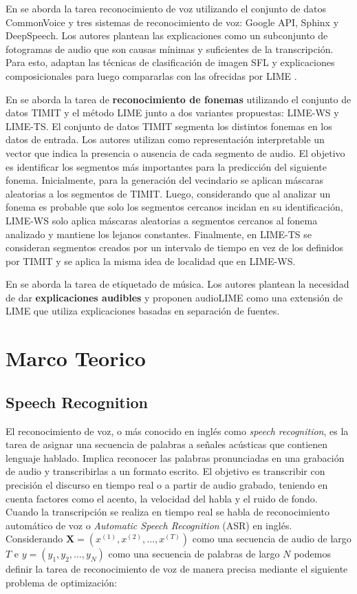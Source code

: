 \documentclass[conference]{IEEEtran}
\begin{document}
En \cite{10094635} se aborda la tarea reconocimiento de voz utilizando el conjunto de datos CommonVoice \cite{commonvoice:2020} y tres sistemas de reconocimiento de voz: Google API, Sphinx y DeepSpeech. Los autores plantean las explicaciones como un subconjunto de fotogramas de audio que son causas mínimas y suficientes de la transcripción. Para esto, adaptan las técnicas de clasificación de imagen SFL \cite{sun2020explaining} y explicaciones composicionales \cite{unknown} para luego compararlas con las ofrecidas por LIME \cite{ribeiro2016why}.

En \cite{wu2023trust} se aborda la tarea de \textbf{reconocimiento de fonemas} utilizando el conjunto de datos TIMIT \cite{timit} y el método LIME junto a dos variantes propuestas: LIME-WS y LIME-TS. El conjunto de datos TIMIT segmenta los distintos fonemas en los datos de entrada. Los autores utilizan como representación interpretable un vector que indica la presencia o ausencia de cada segmento de audio. El objetivo es identificar los segmentos más importantes para la predicción del siguiente fonema. Inicialmente, para la generación del vecindario se aplican máscaras aleatorias a los segmentos de TIMIT. Luego, considerando que al analizar un fonema es probable que solo los segmentos cercanos incidan en su identificación, LIME-WS solo aplica máscaras aleatorias a segmentos cercanos al fonema analizado y mantiene los lejanos constantes. Finalmente, en LIME-TS se consideran segmentos creados por un intervalo de tiempo en vez de los definidos por TIMIT y se aplica la misma idea de localidad que en LIME-WS.

En \cite{DBLP:journals/corr/abs-2008-00582} se aborda la tarea de etiquetado de música. Los autores plantean la necesidad de dar \textbf{explicaciones audibles} y proponen audioLIME como una extensión de LIME que utiliza explicaciones basadas en separación de fuentes.

\section{Marco Teorico} \label{3-Theoretical-Framework}

\subsection{Speech Recognition}
El reconocimiento de voz, o más conocido en inglés como \textit{speech recognition}, es la tarea de asignar una secuencia de palabras a señales acústicas que contienen lenguaje hablado. 
Implica reconocer las palabras pronunciadas en una grabación de audio y transcribirlas a un formato escrito. El objetivo es transcribir con precisión el discurso en tiempo real o a partir de audio grabado, teniendo en cuenta factores como el acento, la velocidad del habla y el ruido de fondo.
Cuando la transcripción se realiza en tiempo real se habla de reconocimiento automático de voz o \textit{Automatic Speech Recognition} (ASR) en inglés. Considerando $\mathbf{X} = (x^{(1)}, x^{(2)} ,\dots, x^{(T)})$ como una secuencia de audio de largo $T$ e $y = (y_1, y_2, \dots, y_N)$ como una secuencia de palabras de largo $N$ podemos definir la tarea de reconocimiento de voz de manera precisa mediante el siguiente problema de optimización:
\end{document}
